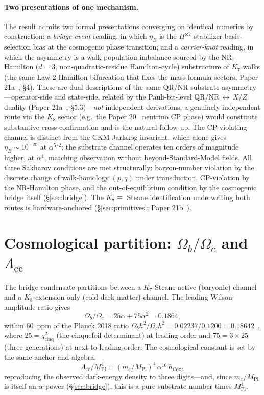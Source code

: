 \documentclass[11pt]{article}
\newcommand{\hcox}{h_{\mathrm{Cox}}}
\newcommand{\Mpl}{M_{\mathrm{Pl}}}
\newcommand{\Lcc}{\Lambda_{\mathrm{cc}}}
\begin{document}
\paragraph{Two presentations of one mechanism.} The result admits two formal presentations converging on identical numerics by construction: a \emph{bridge-event} reading, in which $\eta_B$ is the $H^{\otimes 7}$ stabilizer-basis-selection bias at the cosmogenic phase transition; and a \emph{carrier-knot} reading, in which the asymmetry is a walk-population imbalance sourced by the NR-Hamilton ($d = 3$, non-quadratic-residue Hamilton-cycle) substructure of $K_7$ walks (the same Law-2 Hamilton bifurcation that fixes the mass-formula sectors, Paper 21a~\cite{Paper21a}, \S 4). These are dual descriptions of the same QR/NR substrate asymmetry---operator-side and state-side, related by the Pauli-bit-level QR/NR\,$\leftrightarrow$\,$X$/$Z$ duality (Paper 21a~\cite{Paper21a}, \S 5.3)---\emph{not} independent derivations; a genuinely independent route via the $K_8$ sector (e.g.\ the Paper 20~\cite{Paper20} neutrino CP phase) would constitute substantive cross-confirmation and is the natural follow-up. The CP-violating channel is distinct from the CKM Jarlskog invariant, which alone gives $\eta_B \sim 10^{-20}$ at $\alpha^{5/2}$; the substrate channel operates ten orders of magnitude higher, at $\alpha^4$, matching observation without beyond-Standard-Model fields. All three Sakharov conditions are met structurally: baryon-number violation by the discrete change of walk-homology $(p,q)$ under transduction, CP-violation by the NR-Hamilton phase, and the out-of-equilibrium condition by the cosmogenic bridge itself (\S\ref{sec:bridge}). The $K_7 \equiv$ Steane identification underwriting both routes is hardware-anchored (\S\ref{sec:primitives}; Paper 21b~\cite{Paper21b}).

\section{Cosmological partition: $\Omega_b/\Omega_c$ and $\Lcc$}
\label{sec:partition}

The bridge condensate partitions between a $K_7$-Steane-active (baryonic) channel and a $K_8$-extension-only (cold dark matter) channel. The leading Wilson-amplitude ratio gives
\[ \Omega_b/\Omega_c = 25\alpha + 75\alpha^2 = 0.1864, \]
within $60$~ppm of the Planck 2018 ratio $\Omega_b h^2 / \Omega_c h^2 = 0.02237/0.1200 = 0.18642$~\cite{Planck2018}, where $25 = q_{\mathrm{cinq}}^2$ (the cinquefoil determinant) at leading order and $75 = 3 \times 25$ (three generations) at next-to-leading order. The cosmological constant is set by the same anchor and algebra,
\[ \Lcc/\Mpl^4 = (m_e/\Mpl)^4\,\alpha^{16}\,\hcox, \]
reproducing the observed dark-energy density to three digits---and, since $m_e/\Mpl$ is itself an $\alpha$-power (\S\ref{sec:bridge}), this is a pure substrate number times $\Mpl^4$.
\end{document}
